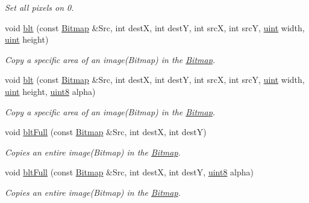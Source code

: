\begin{DoxyCompactItemize}
\begin{DoxyCompactList}\small\item\em Set all pixels on 0. \item\end{DoxyCompactList}\item 
void \hyperlink{class_f2_c_1_1_bitmap_a4fc2795eb440a68d9409db64669e8ef1}{blt} (const \hyperlink{class_f2_c_1_1_bitmap}{Bitmap} \&Src, int destX, int destY, int srcX, int srcY, \hyperlink{namespace_f2_c_a58be2bac9eb3e3c99cb41b6008bf4fae}{uint} width, \hyperlink{namespace_f2_c_a58be2bac9eb3e3c99cb41b6008bf4fae}{uint} height)
\begin{DoxyCompactList}\small\item\em Copy a specific area of an image(Bitmap) in the \hyperlink{class_f2_c_1_1_bitmap}{Bitmap}. \item\end{DoxyCompactList}\item 
void \hyperlink{class_f2_c_1_1_bitmap_ad2ed409040de1fd555e25c04b89062b6}{blt} (const \hyperlink{class_f2_c_1_1_bitmap}{Bitmap} \&Src, int destX, int destY, int srcX, int srcY, \hyperlink{namespace_f2_c_a58be2bac9eb3e3c99cb41b6008bf4fae}{uint} width, \hyperlink{namespace_f2_c_a58be2bac9eb3e3c99cb41b6008bf4fae}{uint} height, \hyperlink{namespace_f2_c_a711deb33697d145669b9c0c4fe87c7ca}{uint8} alpha)
\begin{DoxyCompactList}\small\item\em Copy a specific area of an image(Bitmap) in the \hyperlink{class_f2_c_1_1_bitmap}{Bitmap}. \item\end{DoxyCompactList}\item 
void \hyperlink{class_f2_c_1_1_bitmap_a331c8fd3b1991c248adc464b8082f091}{bltFull} (const \hyperlink{class_f2_c_1_1_bitmap}{Bitmap} \&Src, int destX, int destY)
\begin{DoxyCompactList}\small\item\em Copies an entire image(Bitmap) in the \hyperlink{class_f2_c_1_1_bitmap}{Bitmap}. \item\end{DoxyCompactList}\item 
void \hyperlink{class_f2_c_1_1_bitmap_aa3cd20c474704adcaf89bcd48d0aa00b}{bltFull} (const \hyperlink{class_f2_c_1_1_bitmap}{Bitmap} \&Src, int destX, int destY, \hyperlink{namespace_f2_c_a711deb33697d145669b9c0c4fe87c7ca}{uint8} alpha)
\begin{DoxyCompactList}\small\item\em Copies an entire image(Bitmap) in the \hyperlink{class_f2_c_1_1_bitmap}{Bitmap}. \item\end{DoxyCompactList}\item 

\end{DoxyCompactItemize}
